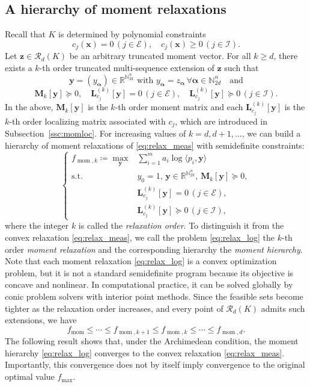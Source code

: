 \documentclass[pdflatex,sn-mathphys-num]{sn-jnl}%
\newcommand{\re}{\mathbb{R}}
\newcommand{\N}{\mathbb{N}}
\newcommand{\vect}[1]{\boldsymbol{#1}}
\newcommand{\mat}[1]{\boldsymbol{#1}}
\newcommand{\st}{\mathrm{s.t.}}
\theoremstyle{thmstyleone}%
\theoremstyle{thmstyletwo}%
\theoremstyle{thmstylethree}%
\begin{document}
\subsection{A hierarchy of moment relaxations}

Recall that $K$ is determined by polynomial constraints
\[
c_j(\vect{x}) = 0\,(j\in\mathcal{E}),\quad c_j(\vect{x})\ge 0\,(j\in\mathcal{I}).
\]
Let $\vect{z}\in\mathscr{R}_d(K)$ be an arbitrary truncated moment vector. 
For all $k\ge d$, there exists a $k$-th order truncated multi-sequence extension of $\vect{z}$
such that
\[
\vect{y}=(y_{\vect{\alpha}})\in\re^{\N_{2k}^n}\,\,\mbox{with}\,\,
y_{\vect{\alpha}} = z_{\vect{\alpha}}
\, \forall \vect{\alpha}\in\N_{2d}^n\quad \mbox{and}
\]
\[
\mat{M}_{k}[\vect{y}]\succeq 0,\quad \mat{L}_{c_j}^{(k)}[\vect{y}] = 0\,(j\in \mathcal{E}),\quad
\mat{L}_{c_j}^{(k)}[\vect{y}]\succeq 0\, (j\in \mathcal{I}).
\]
In the above, $\mat{M}_k[\vect{y}]$ is the $k$-th order moment matrix and each
$\mat{L}_{c_j}^{(k)}[\vect{y}]$ is the $k$-th order 
localizing matrix associated with $c_j$, 
which are introduced in Subsection~\ref{ssc:momloc}.
For increasing values of $k = d,d+1,\ldots$, 
we can build a hierarchy of moment relaxations of \eqref{eq:relax_meas} 
with semidefinite constraints: 
\begin{equation}    \label{eq:relax_log}
	\left\{\begin{array}{rl}
		f_{\operatorname{mom},k} \coloneqq \displaystyle \max\limits_{\vect{y}} 
		& \sum\limits_{i=1}^m a_i \log \langle p_i, \vect{y} \rangle \\
		\st  &  y_0 = 1,\,\vect{y} \in \mathbb{R}^{\mathbb{N}_{2k}^n},\, \mat{M}_k [\vect{y}] \succeq 0,\\
		&   \mat{L}_{c_j}^{(k)}[\vect{y}] = 0\,(j \in \mathcal{E}),\\ 
		& \mat{L}_{c_j}^{(k)}[\vect{y}] \succeq 0 \,(j \in \mathcal{I} ),
	\end{array}\right.
\end{equation}
where the integer $k$ is called the {\it relaxation order}.
To distinguish it from the convex relaxation \eqref{eq:relax_meas},
we call the problem \eqref{eq:relax_log} the 
$k$-th order {\it moment relaxation}
and the corresponding hierarchy the {\it moment hierarchy}.
Note that each moment relaxation \eqref{eq:relax_log} is a convex
optimization problem, but it is not a standard semidefinite program
because its objective is concave and nonlinear.
In computational practice, it can be solved globally by conic problem 
solvers with interior point methods.
Since the feasible sets become tighter as the relaxation order
increases, and every point of $\mathscr{R}_d(K)$ admits such extensions,
we have
\[
f_{\operatorname{mom}}\le \cdots\le f_{\operatorname{mom},k+1}
\le f_{\operatorname{mom},k}\le \cdots \le f_{\operatorname{mom},d}.
\]
The following result shows that, under the Archimedean condition, the
moment hierarchy \eqref{eq:relax_log} converges to the convex relaxation
\eqref{eq:relax_meas}. Importantly, this convergence does not by
itself imply convergence to the original optimal value $f_{\max}$.
\end{document}
